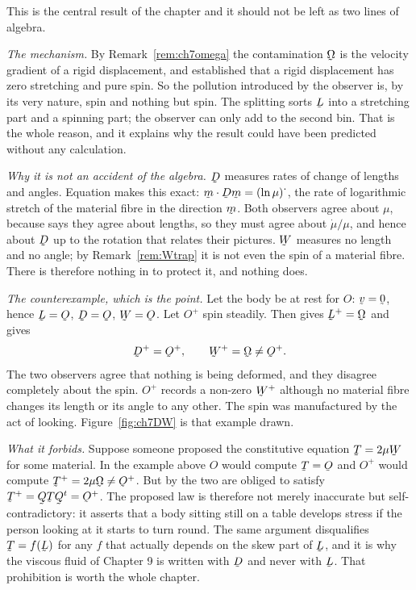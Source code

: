 \begin{remark}\label{rem:ch7DW}
This is the central result of the chapter and it should not be left as
two lines of algebra.

\emph{The mechanism.} By Remark~\ref{rem:ch7omega} the contamination
$\bOm$ is the velocity gradient of a rigid displacement, and 
established that a rigid displacement has zero stretching and pure spin.
So the pollution introduced by the observer is, by its very nature, spin
and nothing but spin. The splitting  sorts $\bL$ into a
stretching part and a spinning part; the observer can only add to the
second bin. That is the whole reason, and it explains why the result
could have been predicted without any calculation.

\emph{Why it is not an accident of the algebra.} $\bD$ measures rates of
change of lengths and angles. Equation  makes this exact:
$\ip\bm{\bD\bm}=(\ln\mu)^{\textstyle\cdot}$, the rate of logarithmic
stretch of the material fibre in the direction $\bm$. Both observers
agree about $\mu$, because  says they agree about lengths, so
they must agree about $\dot\mu/\mu$, and hence about $\bD$ up to the
rotation that relates their pictures. $\bW$ measures no length and no
angle; by Remark~\ref{rem:Wtrap} it is not even the spin of a material
fibre. There is therefore nothing in  to protect it, and nothing
does.

\emph{The counterexample, which is the point.} Let the body be at rest
for $O$: $\bv=\bze$, hence $\bL=\Ob$, $\bD=\Ob$, $\bW=\Ob$. Let $O^{+}$
spin steadily. Then  gives $\bL^{+}=\bOm$ and  gives
\[
   \bD^{+}=\Ob^{+},\qquad \bW^{+}=\bOm\neq\Ob^{+} .
\]
The two observers agree that nothing is being deformed, and they disagree
completely about the spin. $O^{+}$ records a non-zero $\bW^{+}$ although
no material fibre changes its length or its angle to any other. The spin
was manufactured by the act of looking. Figure~\ref{fig:ch7DW} is that
example drawn.

\emph{What it forbids.} Suppose someone proposed the constitutive
equation $\bT=2\mu\bW$ for some material. In the example above $O$ would
compute $\bT=\Ob$ and $O^{+}$ would compute
$\bT^{+}=2\mu\bOm\neq\Ob^{+}$. But by  the two are obliged to
satisfy $\bT^{+}=\bQ\bT\bQ^{t}=\Ob^{+}$. The proposed law is therefore
not merely inaccurate but self-contradictory: it asserts that a body
sitting still on a table develops stress if the person looking at it
starts to turn round. The same argument disqualifies $\bT=f(\bL)$ for any
$f$ that actually depends on the skew part of $\bL$, and it is why the
viscous fluid of Chapter 9 is written with $\bD$ and never with $\bL$.
That prohibition is worth the whole chapter.
\end{remark}

